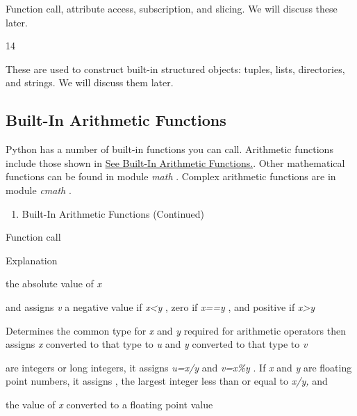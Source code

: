 Function call, attribute access,
subscription, and slicing. We will discuss these later.

14









These are used to construct
built-in structured objects: tuples, lists, directories, and strings. We
will discuss them later.

\subsection{Built-In Arithmetic Functions}
\label{built-in-arithmetic-functions}

Python has a number of built-in
functions you can call. Arithmetic functions include those shown in
\href{chap2.html\#32777}{See Built-In Arithmetic Functions.}. Other
mathematical functions can be found in module \emph{math} . Complex
arithmetic functions are in module \emph{cmath} .

\begin{enumerate}
\tightlist
\item
  Built-In Arithmetic Functions (Continued)
\end{enumerate}

Function call

Explanation



 the absolute
value of \emph{x}



 and
assigns \emph{v} a negative value if \emph{x\textless{}y} , zero if
\emph{x==y} , and positive if \emph{x\textgreater{}y}



Determines the common type for
\emph{x} and \emph{y} required for arithmetic operators then assigns
\emph{x} converted to that type to \emph{u} and \emph{y} converted to
that type to \emph{v}



 are
integers or long integers, it assigns \emph{u=x/y} and \emph{v=x\%y} .
If \emph{x} and \emph{y} are floating point numbers, it assigns
, the largest integer less than or equal
to \emph{x/y,} and



 the value of
\emph{x} converted to a floating point value



